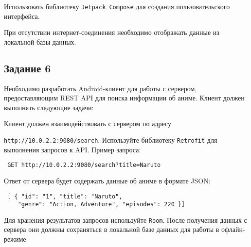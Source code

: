 \documentclass[a4paper,12pt]{article}
\begin{document}
Использовать библиотеку \texttt{Jetpack Compose} для создания пользовательского интерфейса.


При отсутствии интернет-соединения необходимо отображать данные из локальной базы данных.

\subsection*{Задание 6}

Необходимо разработать Android-клиент для работы с сервером, предоставляющим REST API для поиска информации об аниме. Клиент должен выполнять следующие задачи:


Клиент должен взаимодействовать с сервером по адресу 

\texttt{http://10.0.2.2:9080/search}. Используйте библиотеку \texttt{Retrofit} для выполнения запросов к API. Пример запроса:

\begin{verbatim} GET http://10.0.2.2:9080/search?title=Naruto \end{verbatim}

Ответ от сервера будет содержать данные об аниме в формате JSON:

\begin{verbatim} [ { "id": "1", "title": "Naruto", 
    "genre": "Action, Adventure", "episodes": 220 }] \end{verbatim}


Для хранения результатов запросов используйте \texttt{Room}. После получения данных с сервера они должны сохраняться в локальной базе данных для работы в офлайн-режиме.

\end{document}
